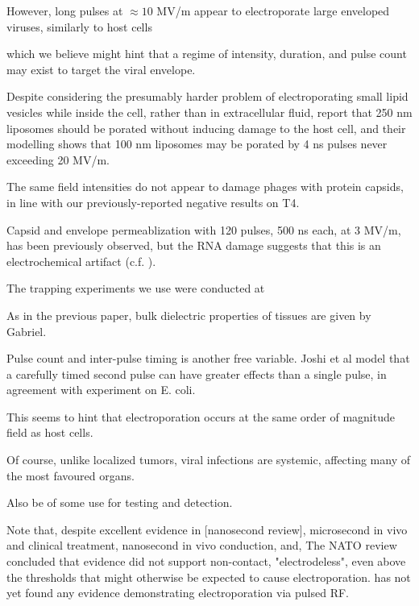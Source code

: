 \documentclass[fleqn,10pt]{paper}
\begin{document}
However, long pulses at $\approx10$ MV/m appear to electroporate large enveloped viruses, similarly to host cells\cite{AC2017}


 which we believe might hint that a regime of intensity, duration, and pulse count may exist to target the viral envelope. 
 
Despite considering the presumably harder problem of electroporating small lipid vesicles while inside the cell, rather than in extracellular fluid, \cite{Electroporation2013} report that 250 nm liposomes should be porated without inducing damage to the host cell, and their modelling shows that 100 nm liposomes may be porated by 4 ns pulses never exceeding 20 MV/m. 

The same field intensities do not appear to damage phages with protein capsids\cite{Manipulation2013}, in line with our previously-reported negative results on T4.

Capsid and envelope permeablization with 120 pulses, 500 ns each, at 3 MV/m, has been previously observed\cite{Inactivation1990}, but the RNA damage suggests that this is an electrochemical artifact \cite{Formation1996} (c.f. \cite{Microwave1987}). 

The trapping experiments we use were conducted at 


As in the previous paper, bulk dielectric properties of tissues are given by Gabriel. 


Pulse count and inter-pulse timing is another free variable. Joshi et al \cite{Selfconsistent2001} model that a carefully timed second pulse can have greater effects than a single pulse, in agreement with experiment on E. coli.

This seems to hint that electroporation occurs at the same order of magnitude field as host cells.

Of course, unlike localized tumors, viral infections are systemic, affecting many of the most favoured organs. 

Also be of some use for testing and detection. 



Note that, despite excellent evidence in [nanosecond review], microsecond in vivo and clinical treatment, nanosecond in vivo conduction, and, The NATO review concluded that evidence did not support non-contact, "electrodeless", even above the thresholds that might otherwise be expected to cause electroporation. has not yet found any evidence demonstrating electroporation via pulsed RF. 
\end{document}
